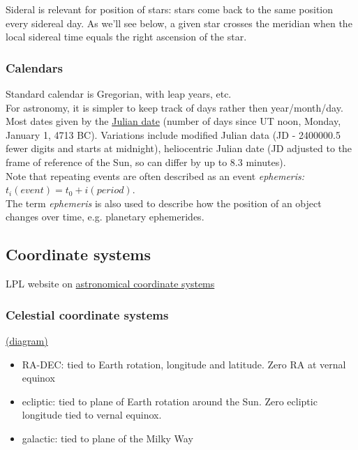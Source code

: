 \documentclass[12pt]{article}
\begin{document}
\noindent Sideral is relevant for position of stars: stars come back
to the same position every sidereal day. As we'll see
below, a given star crosses the meridian when the
local sidereal time equals the right ascension of the
star.

\subsubsection*{Calendars}
\noindent Standard calendar is Gregorian, with leap years, etc.\\

\noindent For astronomy, it is simpler to keep track of days rather
    then year/month/day. Most dates given by the
    \url{Julian date} (number of days since UT noon, Monday,
    January 1, 4713 BC). Variations include modified Julian
    data (JD - 2400000.5 fewer digits and starts at midnight),
    heliocentric Julian date (JD adjusted to the frame of
    reference of the Sun, so can differ by up to 8.3 minutes).\\

\noindent Note that repeating events are often described as an event
    \emph{ephemeris:} $t_i(event) = t_0 + i(period)$.\\

\noindent The term \emph{ephemeris} is also used to describe how the
    position of an object changes over time, e.g. planetary
    ephemerides.

\subsection*{Coordinate systems}
LPL website on \textcolor{blue}
{\href{http://spider.seds.org/spider/ScholarX/coords.html}
{astronomical coordinate systems}}
\subsubsection*{Celestial coordinate systems}
\textcolor{blue}
{\href{http://csep10.phys.utk.edu/astr161/lect/time/coordinates.html}{(diagram)}}
\begin{itemize}
    \item RA-DEC: tied to Earth rotation, longitude and latitude.
        Zero RA at vernal equinox
    \item ecliptic: tied to plane of Earth rotation around the Sun.
        Zero ecliptic longitude tied to vernal equinox.
    \item galactic: tied to plane of the Milky Way
\end{itemize}
\end{document}
